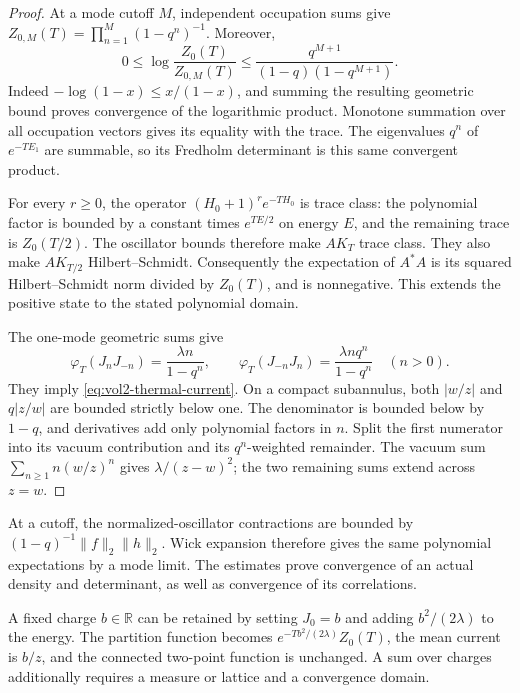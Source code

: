 \begin{proof}
At a mode cutoff \(M\), independent occupation sums give
\(Z_{0,M}(T)=\prod_{n=1}^M(1-q^n)^{-1}\). Moreover,
\begin{equation}\label{eq:vol2-partition-tail}
 0\leq\log\frac{Z_0(T)}{Z_{0,M}(T)}
 \leq\frac{q^{M+1}}{(1-q)(1-q^{M+1})}.
\end{equation}
Indeed \(-\log(1-x)\leq x/(1-x)\), and summing the resulting
geometric bound proves convergence of the logarithmic product.
Monotone summation over all occupation vectors gives its equality
with the trace. The eigenvalues \(q^n\) of \(e^{-TE_1}\) are
summable, so its Fredholm determinant is this same convergent product.

For every \(r\geq0\), the operator \((H_0+1)^r e^{-TH_0}\)
is trace class: the polynomial factor is bounded by a constant
times \(e^{TE/2}\) on energy \(E\), and the remaining trace is
\(Z_0(T/2)\). The oscillator bounds therefore make \(A K_T\)
trace class. They also make \(A K_{T/2}\) Hilbert--Schmidt.
Consequently the expectation of \(A^*A\) is its squared
Hilbert--Schmidt norm divided by \(Z_0(T)\), and is nonnegative.
This extends the positive state to the stated polynomial domain.

The one-mode geometric sums give
\[
 \varphi_T(J_nJ_{-n})=\frac{\lambda n}{1-q^n},\qquad
 \varphi_T(J_{-n}J_n)=\frac{\lambda n q^n}{1-q^n}
 \quad(n>0).
\]
They imply \eqref{eq:vol2-thermal-current}. On a compact subannulus,
both \(|w/z|\) and \(q|z/w|\) are bounded strictly below one.
The denominator is bounded below by \(1-q\), and derivatives add
only polynomial factors in \(n\). Split the first numerator into
its vacuum contribution and its \(q^n\)-weighted remainder.
The vacuum sum \(\sum_{n\geq1}n(w/z)^n\) gives
\(\lambda/(z-w)^2\); the two remaining sums extend across \(z=w\).
\end{proof}

At a cutoff, the normalized-oscillator contractions are bounded by
\((1-q)^{-1}\|f\|_2\|h\|_2\). Wick expansion therefore gives
the same polynomial expectations by a mode limit. The estimates
prove convergence of an actual density and determinant, as well as
convergence of its correlations.

A fixed charge \(b\in\mathbb R\) can be retained by setting
\(J_0=b\) and adding \(b^2/(2\lambda)\) to the energy.
The partition function becomes \(e^{-Tb^2/(2\lambda)}Z_0(T)\),
the mean current is \(b/z\), and the connected two-point function
is unchanged. A sum over charges additionally requires a measure
or lattice and a convergence domain.

